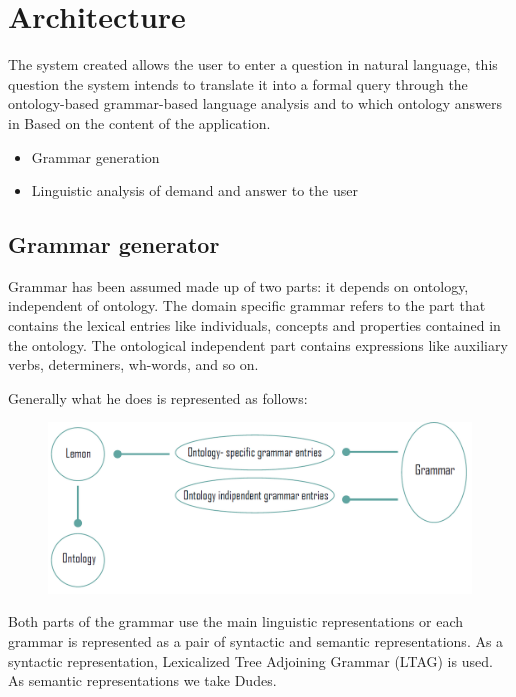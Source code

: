\section{Architecture}
\label{sec:architecture}
The system created allows the user to enter a question in natural language, this question the system intends to translate it into a formal query through the ontology-based grammar-based language analysis and to which ontology answers in Based on the content of the application.
\begin{itemize}
	\item Grammar generation
	\item Linguistic analysis of demand and answer to the user
\end{itemize}

\subsection{Grammar generator}
Grammar has been assumed made up of two parts: it depends on ontology, independent of ontology. The domain specific grammar refers to the part that contains the lexical entries like individuals, concepts and properties contained in the ontology. The ontological independent part contains expressions like auxiliary verbs, determiners, wh-words, and so on.

Generally what he does is represented as follows:

\begin{figure}[H]
   \centering
    \includegraphics[scale=0.5]{./fig/grammar}
     \caption{}
    \label{fig: grammar}
\end{figure}

Both parts of the grammar use the main linguistic representations or each grammar is represented as a pair of syntactic and semantic representations. As a syntactic representation, Lexicalized Tree Adjoining Grammar (LTAG) is used. As semantic representations we take Dudes.

